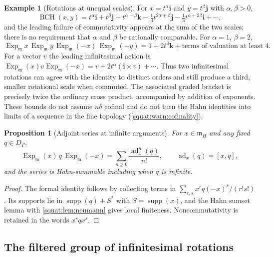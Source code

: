\documentclass[11pt,letterpaper]{article}
\numberwithin{equation}{section}
\newtheorem{proposition}[proposition]{Proposition}
\theoremstyle{definition}
\newtheorem{example}[example]{Example}
\theoremstyle{remark}
\newcommand{\mm}{\mathfrak m}
\newcommand{\ii}{\mathbf i}
\newcommand{\jj}{\mathbf j}
\newcommand{\kk}{\mathbf k}
\newcommand{\supp}{\operatorname{supp}}
\newcommand{\ad}{\operatorname{ad}}
\newcommand{\Exp}{\operatorname{Exp}}
\newcommand{\Expm}{\Exp_{\mm}}
\newcommand{\BCH}{\operatorname{BCH}}
\begin{document}
\begin{example}[Rotations at unequal scales]\label{squat:ex:unequalscales}
For $x=t^\alpha\ii$ and $y=t^\beta\jj$ with $\alpha,\beta>0$,
\[
 \BCH(x,y)=t^\alpha\ii+t^\beta\jj+t^{\alpha+\beta}\kk
 -\tfrac13t^{2\alpha+\beta}\jj-\tfrac13t^{\alpha+2\beta}\ii+\cdots,
\]
and the leading failure of commutativity appears at the sum of the two scales; there is no
requirement that $\alpha$ and $\beta$ be rationally comparable. For $\alpha=1$, $\beta=2$,
\[
 \Expm x\,\Expm y\,\Expm(-x)\,\Expm(-y)=1+2t^3\kk+
 \text{terms of valuation at least }4 .
\]
For a vector $v$ the leading infinitesimal action is
$\Expm(x)v\Expm(-x)=v+2t^\alpha(\ii\times v)+\cdots$. Thus two infinitesimal rotations can
agree with the identity to distinct orders and still produce a third, smaller rotational
scale when commuted. The associated graded bracket is precisely twice the ordinary cross
product, accompanied by addition of exponents. These bounds do not assume $n\delta$
cofinal and do not turn the Hahn identities into limits of a sequence in the fine topology
(\cref{squat:warn:cofinality}).
\end{example}

\begin{proposition}[Adjoint series at infinite arguments]\label{squat:prop:adjoint}
For $x\in\mm_H$ and any fixed $q\in D_\Gamma$,
\begin{equation}\label{squat:eq:adjoint}
 \Expm(x)\,q\,\Expm(-x)=\sum_{n\ge0}\frac{\ad_x^n(q)}{n!},
 \qquad \ad_x(q)=[x,q],
\end{equation}
and the series is Hahn-summable \emph{including when $q$ is infinite}.
\end{proposition}
\begin{proof}
The formal identity follows by collecting terms in $\sum_{r,s}x^rq(-x)^s/(r!s!)$. Its
supports lie in $\supp(q)+S^*$ with $S=\supp(x)$, and the Hahn sumset lemma with
\cref{squat:lem:neumann} gives local finiteness. Noncommutativity is retained in the words
$x^rqx^s$.
\end{proof}

\subsection{The filtered group of infinitesimal rotations}\label{squat:sub:rotationgroup}
\end{document}
